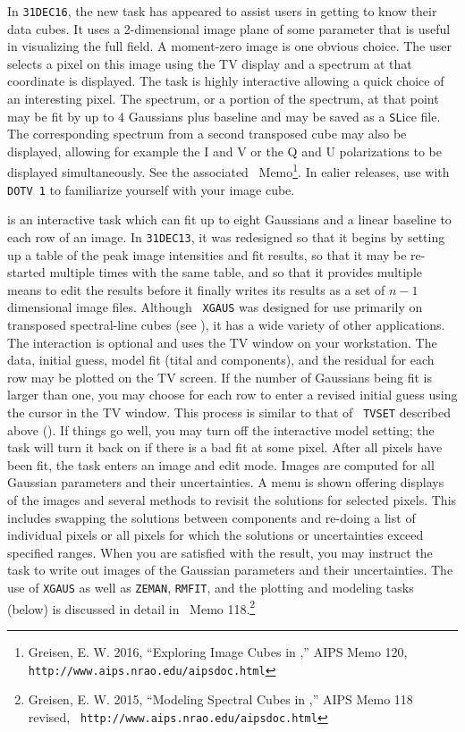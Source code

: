 
     In {\tt 31DEC16}, the new task {\tt {}} has appeared to
assist users in getting to know their data cubes.  It uses a
2-dimensional image plane of some parameter that is useful in
visualizing the full field.  A moment-zero image is one obvious
choice.  The user selects a pixel on this image using the TV display
and a spectrum at that coordinate is displayed.  The task is highly
interactive allowing a quick choice of an interesting pixel.  The
spectrum, or a portion of the spectrum, at that point may be fit by up
to 4 Gaussians plus baseline and may be saved as a {\tt SL}ice file.
The corresponding spectrum from a second transposed cube may also be
displayed, allowing for example the I and V or the Q and U
polarizations to be displayed simultaneously.  See the associated
\AIPS\ Memo\footnote{Greisen, E. W. 2016, ``Exploring Image Cubes in
\AIPS,'' AIPS Memo 120,  {\tt http://www.aips.nrao.edu/aipsdoc.html}}.
In ealier releases, use {\tt {}} with {\tt DOTV 1} to
familiarize yourself with your image cube.

     {\tt {}} is an interactive task which can fit up to
eight Gaussians and a linear baseline to each row of an image.  In
{\tt 31DEC13}, it was redesigned so that it begins by setting up a
table of the peak image intensities and fit results, so that it may
be re-started multiple times with the same table, and so that it
provides multiple means to edit the results before it finally writes
its results as a set of $n-1$ dimensional image files.  Although {\tt
XGAUS} was designed for use primarily on transposed spectral-line
cubes (see ), it has a wide variety of other
applications.  The interaction is optional and uses the TV window on
your workstation.  The data, initial guess, model fit (tital and
components), and the residual for each row may be plotted on the TV
screen.  If the number of Gaussians being fit is larger than one, you
may choose for each row to enter a revised initial guess using the
cursor in the TV window.  This process is similar to that of {\tt
TVSET} described above ().    If things go well, you may
turn off the interactive model setting; the task will turn it back on
if there is a bad fit at some pixel.  After all pixels have been fit,
the task enters an image and edit mode.  Images are computed for all
Gaussian parameters and their uncertainties.  A menu is shown offering
displays of the images and several methods to revisit the solutions
for selected pixels.  This includes swapping the solutions between
components and re-doing a list of individual pixels or all pixels for
which the solutions or uncertainties exceed specified ranges.  When
you are satisfied with the result, you may instruct the task to write
out images of the Gaussian parameters and their uncertainties.  The
use of {\tt XGAUS} as well as {\tt ZEMAN}, {\tt RMFIT}, and the
plotting and modeling tasks (below) is discussed in detail in \AIPS\
Memo 118.\footnote{Greisen, E. W. 2015, ``Modeling Spectral Cubes in
\AIPS,'' AIPS Memo 118 revised, {\tt
http://www.aips.nrao.edu/aipsdoc.html}}

